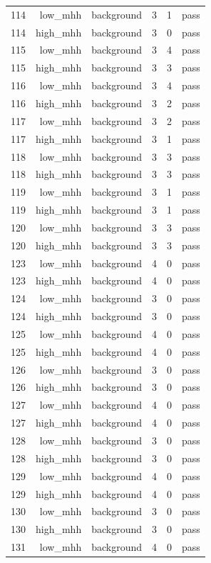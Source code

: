 \begin{table}[htbp]
{\begin{tabular}{lrrrrr}
114 & low\_mhh & background & 3 & 1 & pass \\
114 & high\_mhh & background & 3 & 0 & pass \\
115 & low\_mhh & background & 3 & 4 & pass \\
115 & high\_mhh & background & 3 & 3 & pass \\
116 & low\_mhh & background & 3 & 4 & pass \\
116 & high\_mhh & background & 3 & 2 & pass \\
117 & low\_mhh & background & 3 & 2 & pass \\
117 & high\_mhh & background & 3 & 1 & pass \\
118 & low\_mhh & background & 3 & 3 & pass \\
118 & high\_mhh & background & 3 & 3 & pass \\
119 & low\_mhh & background & 3 & 1 & pass \\
119 & high\_mhh & background & 3 & 1 & pass \\
120 & low\_mhh & background & 3 & 3 & pass \\
120 & high\_mhh & background & 3 & 3 & pass \\
123 & low\_mhh & background & 4 & 0 & pass \\
123 & high\_mhh & background & 4 & 0 & pass \\
124 & low\_mhh & background & 3 & 0 & pass \\
124 & high\_mhh & background & 3 & 0 & pass \\
125 & low\_mhh & background & 4 & 0 & pass \\
125 & high\_mhh & background & 4 & 0 & pass \\
126 & low\_mhh & background & 3 & 0 & pass \\
126 & high\_mhh & background & 3 & 0 & pass \\
127 & low\_mhh & background & 4 & 0 & pass \\
127 & high\_mhh & background & 4 & 0 & pass \\
128 & low\_mhh & background & 3 & 0 & pass \\
128 & high\_mhh & background & 3 & 0 & pass \\
129 & low\_mhh & background & 4 & 0 & pass \\
129 & high\_mhh & background & 4 & 0 & pass \\
130 & low\_mhh & background & 3 & 0 & pass \\
130 & high\_mhh & background & 3 & 0 & pass \\
131 & low\_mhh & background & 4 & 0 & pass \\

\end{tabular}}
\end{table}
